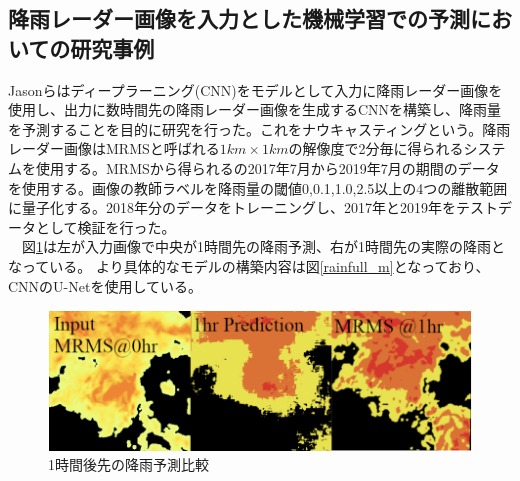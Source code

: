 \subsection{降雨レーダー画像を入力とした機械学習での予測においての研究事例}
Jason\cite{Related-Research2}らはディープラーニング(CNN)をモデルとして入力に降雨レーダー画像を使用し、出力に数時間先の降雨レーダー画像を生成するCNNを構築し、降雨量を予測することを目的に研究を行った。これをナウキャスティングという。降雨レーダー画像はMRMS\cite{MRMA}と呼ばれる$1km\times1km$の解像度で2分毎に得られるシステムを使用する。MRMSから得られるの2017年7月から2019年7月の期間のデータを使用する。画像の教師ラベルを降雨量の閾値0,0.1,1.0,2.5以上の4つの離散範囲に量子化する。2018年分のデータをトレーニングし、2017年と2019年をテストデータとして検証を行った。
\\　図\ref{R_r_r}は左が入力画像で中央が1時間先の降雨予測、右が1時間先の実際の降雨となっている。
より具体的なモデルの構築内容は図\ref{rainfull_m}となっており、CNNのU-Netを使用している。
\begin{figure}[H]
 \centering
 \includegraphics[keepaspectratio, scale=0.5]{fig/chapter1/Related_research_rainfall.png}
 \caption{1時間後先の降雨予測比較\cite{Related-Research2}}
 \label{R_r_r}
\end{figure}

